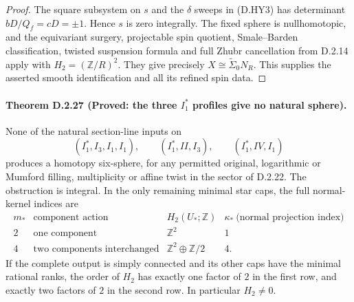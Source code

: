 \begin{proof}
The square subsystem on $s$ and the $\delta$ sweeps in (D.HY3)
has determinant $bD/Q_f=cD=\pm1$. Hence $s$ is zero integrally.
The fixed sphere is nullhomotopic, and the equivariant surgery,
projectable spin quotient, Smale--Barden classification, twisted
suspension formula and full Zhubr cancellation from D.2.14 apply
with $H_2=(\mathbb Z/R)^2$. They give precisely
$X\cong\widetilde\Sigma_0N_R$. This supplies the asserted smooth
identification and all its refined spin data.
\end{proof}


\paragraph{Theorem D.2.27 (Proved: the three $I_1^*$ profiles give no natural sphere).}
None of the natural section-line inputs on
\[
 (I_1^*,I_3,I_1,I_1),\qquad (I_1^*,II,I_3),\qquad
 (I_1^*,IV,I_1)
\]
produces a homotopy six-sphere, for any permitted original,
logarithmic or Mumford filling, multiplicity or affine twist in
the sector of D.2.22. The obstruction is integral. In the only
remaining minimal star caps, the full normal-kernel indices are
\[
\begin{array}{c|c|c|c}
 m_*&\text{component action}&H_2(U_*;\mathbb Z)
       &\kappa_*\ \text{(normal projection index)}\\\hline
 2&\text{one component}&\mathbb Z^2&1\\
 4&\text{two components interchanged}&
                   \mathbb Z^2\oplus\mathbb Z/2&4.
\end{array}                                                   \tag{D.ST1}
\]
If the complete output is simply connected and its other caps
have the minimal rational ranks, the order of $H_2$ has exactly
one factor of $2$ in the first row, and exactly two factors of $2$
in the second row. In particular $H_2\ne0$.

